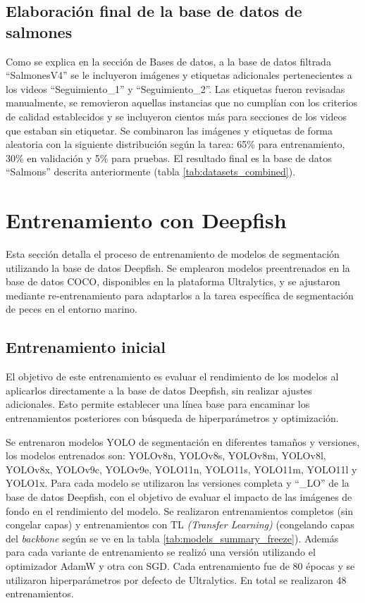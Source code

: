 \subsection{Elaboración final de la base de datos de salmones}
Como se explica en la sección de Bases de datos, a la base de datos filtrada ``SalmonesV4'' se le incluyeron imágenes y etiquetas adicionales pertenecientes a los videos ``Seguimiento_1'' y ``Seguimiento_2''. Las etiquetas fueron revisadas manualmente, se removieron aquellas instancias que no cumplían con los criterios de calidad establecidos y se incluyeron cientos más para secciones de los videos que estaban sin etiquetar. Se combinaron las imágenes y etiquetas de forma aleatoria con la siguiente distribución según la tarea: 65\% para entrenamiento, 30\% en validación y 5\% para pruebas. El resultado final es la base de datos ``Salmons'' descrita anteriormente (tabla \ref{tab:datasets_combined}).

\section{Entrenamiento con Deepfish}
Esta sección detalla el proceso de entrenamiento de modelos de segmentación utilizando la base de datos Deepfish. Se emplearon modelos preentrenados en la base de datos COCO, disponibles en la plataforma Ultralytics, y se ajustaron mediante re-entrenamiento para adaptarlos a la tarea específica de segmentación de peces en el entorno marino.

\subsection{Entrenamiento inicial}
El objetivo de este entrenamiento es evaluar el rendimiento de los modelos al aplicarlos directamente a la base de datos Deepfish, sin realizar ajustes adicionales. Esto permite establecer una línea base para encaminar los entrenamientos posteriores con búsqueda de hiperparámetros y optimización.

Se entrenaron modelos YOLO de segmentación en diferentes tamaños y versiones, los modelos entrenados son: YOLOv8n, YOLOv8s, YOLOv8m, YOLOv8l, YOLOv8x, YOLOv9c, YOLOv9e, YOLO11n, YOLO11s, YOLO11m, YOLO11l y YOLO1x. Para cada modelo se utilizaron las versiones completa y ``_LO'' de la base de datos Deepfish, con el objetivo de evaluar el impacto de las imágenes de fondo en el rendimiento del modelo. Se realizaron entrenamientos completos (sin congelar capas) y entrenamientos con TL \textit{(Transfer Learning)} (congelando capas del \textit{backbone} según se ve en la tabla \ref{tab:models_summary_freeze}). Además para cada variante de entrenamiento se realizó una versión utilizando el optimizador AdamW y otra con SGD. Cada entrenamiento fue de 80 épocas y se utilizaron hiperparámetros por defecto de Ultralytics. En total se realizaron 48 entrenamientos.

